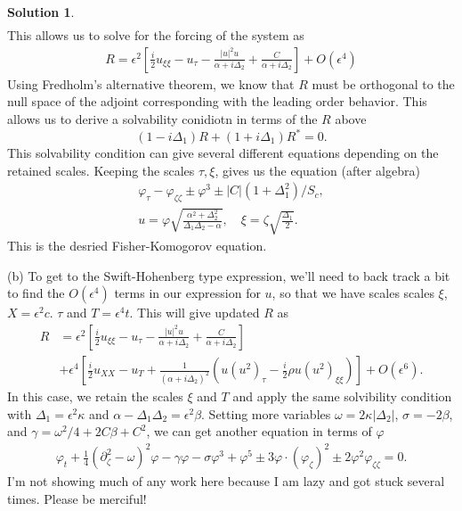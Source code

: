 \documentclass[12pt]{article}
\newcommand{\abs}[1]{ \left| #1 \right| }
\renewcommand{\phi}{\varphi}
\theoremstyle{definition}
\newtheorem{sol}{Solution}
\theoremstyle{remark}
\begin{document}
\begin{sol}
\begin{align*}
    \end{align*}
    This allows us to solve for the forcing of the system as 
\begin{align*}
    R = \epsilon^{2} \left[  \frac{i}{2} u_{\xi \xi} - u_{\tau} - \frac{\abs{u}^{2} u}{\alpha + i \Delta_{2}} + \frac{C}{\alpha + i \Delta_{2}}\right] + O(\epsilon^{4})
\end{align*}
    Using Fredholm's alternative theorem, we know that $R$ must be orthogonal to the null space of the adjoint corresponding with the leading order behavior. This allows us to derive a solvability conidiotn in terms of the  $R$ above
    \begin{equation*}
        (1 - i \Delta_{1}) R + (1 + i \Delta_{1}) R^{*} = 0.
    \end{equation*}
    This solvability condition can give several different equations depending on the retained scales. Keeping the scales $\tau, \xi$, gives us the equation (after algebra)
     \begin{align*}
         \phi_{\tau} - \phi_{\zeta\zeta} \pm \phi^{3} \pm \abs{C}(1 + \Delta_{1}^{2}) / S_{c},\\
         u = \phi \sqrt{ \frac{\alpha^{2} + \Delta_{2}^{2}}{\Delta_{1} \Delta_{2} - \alpha} }, 
         \quad \xi = \zeta \sqrt{\frac{\Delta_{1}}{2}}.
    \end{align*}
This is the desried Fisher-Komogorov equation.

\newpage

(b) To get to the Swift-Hohenberg type expression, we'll need to back track a bit to find the $O(\epsilon^{4})$ terms in our expression for $u$, so that we have scales scales  $\xi$, $X = \epsilon^{2} c$. $\tau$ and  $T = \epsilon^{4} t$. This will give updated $R$ as
\begin{align*}
    R &= \epsilon^{2} \left[  \frac{i}{2} u_{\xi \xi} - u_{\tau} - \frac{\abs{u}^{2} u}{\alpha + i \Delta_{2}} + \frac{C}{\alpha + i \Delta_{2}}\right]\\
      &+ \epsilon^{4} \left[ \frac{i}{2} u_{XX} - u_{T} + \frac{1}{(\alpha + i \Delta_{2})^{2}} 
      \left( u(u^{2})_{\tau} - \frac{i}{2} \rho u (u^{2})_{\xi\xi} \right)\right] + O(\epsilon^{6}).
\end{align*}
In this case, we retain the scales $\xi$ and $T$ and apply the same solvibility condition with $\Delta_{1} = \epsilon^{2} \kappa$ and $\alpha - \Delta_{1} \Delta_{2} = \epsilon^{2} \beta$.  Setting more variables $\omega = 2 \kappa \abs{\Delta_{2}}$, $\sigma = -2 \beta$, and  $\gamma = \omega^{2} / 4 + 2 C \beta + C^{2}$, we can get another equation in terms of $\phi$ 
\begin{align*}
    \phi_{t} + \frac{1}{4} \left(\partial_{\zeta}^{2} - \omega \right)^{2} \phi - \gamma \phi - \sigma \phi^{3} + \phi^{5} \pm 3 \phi \cdot (\phi_{\zeta})^{2} \pm 2 \phi^{2} \phi_{\zeta \zeta} = 0.
\end{align*}
I'm not showing much of any work here because I am lazy and got stuck several times. Please be merciful!
\end{sol}
\end{document}
